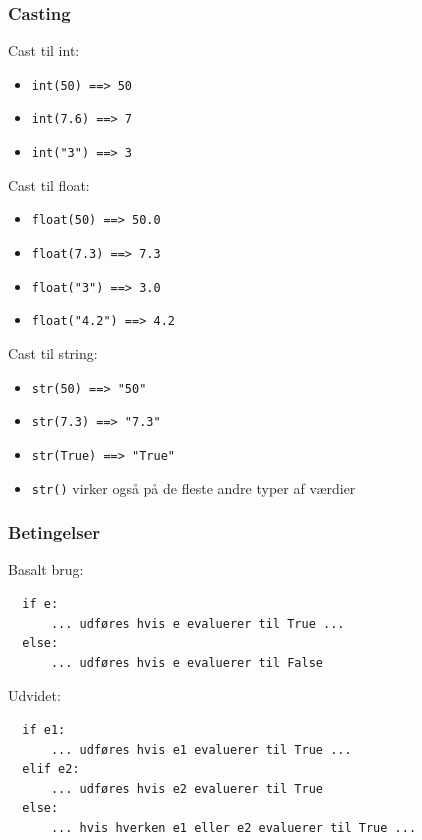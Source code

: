 \documentclass[10pt]{beamer}
\begin{document}
\begin{frame}
  \frametitle{Casting}
  \vspace{5mm}
Cast til int:
\begin{itemize}
\item \texttt{int(50) ==> 50}
\item \texttt{int(7.6) ==> 7}
\item \texttt{int("3") ==> 3}
\end{itemize}

  \vspace{5mm}
Cast til float:
\begin{itemize}
\item \texttt{float(50) ==> 50.0}
\item \texttt{float(7.3) ==> 7.3}
\item \texttt{float("3") ==> 3.0}
\item \texttt{float("4.2") ==> 4.2}
\end{itemize}

\vspace{5mm}
Cast til string:
\begin{itemize}
\item \texttt{str(50) ==> "50"}
\item \texttt{str(7.3) ==> "7.3"}
\item \texttt{str(True) ==> "True"}
\item \texttt{str()} virker også på de fleste andre typer af værdier
\end{itemize}

\end{frame}

\begin{frame}[fragile]
  \frametitle{Betingelser}

Basalt brug:
\begin{verbatim}
  if e:
      ... udføres hvis e evaluerer til True ...
  else:
      ... udføres hvis e evaluerer til False
\end{verbatim}

Udvidet:
\begin{verbatim}
  if e1:
      ... udføres hvis e1 evaluerer til True ...
  elif e2:
      ... udføres hvis e2 evaluerer til True
  else:
      ... hvis hverken e1 eller e2 evaluerer til True ...
\end{verbatim}
\end{frame}
\end{document}
